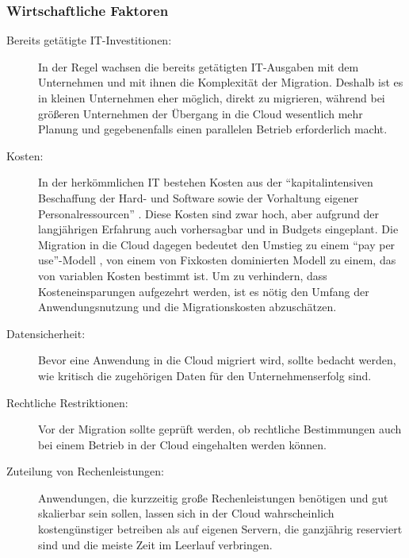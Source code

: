 \subsubsection{Wirtschaftliche Faktoren}
\begin{description}
	\item[Bereits getätigte IT-Investitionen:]
	In der Regel wachsen die bereits getätigten IT-Ausgaben mit dem 
Unternehmen und mit ihnen die Komplexität der Migration. Deshalb ist es in 
kleinen Unternehmen eher möglich, direkt zu migrieren, während bei 
größeren Unternehmen der Übergang in die Cloud wesentlich mehr Planung und 
gegebenenfalls einen parallelen Betrieb erforderlich macht.

	\item[Kosten:] In der herkömmlichen IT bestehen Kosten aus der 
"`kapitalintensiven Beschaffung der Hard- und Software sowie der Vorhaltung 
eigener Personalressourcen"' . Diese Kosten sind 
zwar hoch, aber aufgrund der langjährigen Erfahrung auch vorhersagbar und in 
Budgets eingeplant. Die Migration in die Cloud dagegen bedeutet den Umstieg zu 
einem "`pay per use"'-Modell , von einem 
von Fixkosten dominierten Modell zu einem, das von variablen Kosten bestimmt 
ist. 
Um zu verhindern, dass Kosteneinsparungen aufgezehrt werden, ist es nötig 
den Umfang der Anwendungsnutzung und die Migrationskosten abzuschätzen.


	\item[Datensicherheit:] Bevor eine Anwendung in die Cloud migriert 
wird, sollte bedacht werden, wie kritisch die zugehörigen Daten für den 
Unternehmenserfolg sind. 
	\item[Rechtliche Restriktionen:] Vor der Migration sollte geprüft 
werden, ob rechtliche Bestimmungen auch bei einem Betrieb in der Cloud 
eingehalten werden können. 
	\item[Zuteilung von Rechenleistungen:] Anwendungen, die kurzzeitig 
große Rechenleistungen benötigen und gut skalierbar sein sollen, lassen sich in 
der Cloud wahrscheinlich kostengünstiger betreiben als auf eigenen Servern, die 
ganzjährig reserviert sind und die meiste Zeit im Leerlauf verbringen. 
\end{description}


